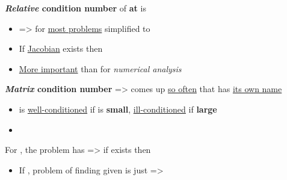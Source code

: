 \textbf{\emph{Relative} condition number}  of \textbf{ at } is
\begin{itemize}

      \item

            => for \underline{most problems} simplified to
      \item
            If \underline{Jacobian}  exists then
      \item
            \underline{More important} than \iMbox{\hat{\kappa}} for \emph{numerical analysis}
\end{itemize}

\textbf{\emph{Matrix} condition number} 
=> comes up \underline{so often} that has \underline{its own name}
\begin{itemize}
      \item
             is \underline{well-conditioned} if
             is \textbf{small}, \underline{ill-conditioned} if
            \textbf{large}
      \item
\end{itemize}

\hSep %

For , the problem
 has
 => if
 exists then 

\begin{itemize}

      \item
            If , problem of finding  given  is
            just  =>
\end{itemize}


